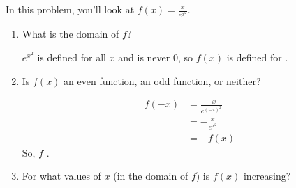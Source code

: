 \documentclass{article}
\begin{document}
\begin{enumerate}
  In this problem, you'll look at $\displaystyle f(x) =
  \frac{x}{e^{x^2}}$. 

  \begin{enumerate}

  \item
    \begin{problem}[0.5in]
      What is the domain of $f$?
    \end{problem}

    \begin{solution}
      $e^{x^2}$ is defined for all $x$ and is never 0, so $f(x)$ is
      defined for . 
    \end{solution}

  \item
    \begin{problem}[\vfill]
      Is $f(x)$ an even function, an odd function, or neither?
    \end{problem}

    \begin{solution}
      \begin{align*}
        f(-x) &= \frac{-x}{e^{(-x)^2}} \\
        &= - \frac{x}{e^{x^2}} \\
        &= - f(x)
      \end{align*}
      So, $f$ . 
    \end{solution}

  \item \label{curve-sketching-with-sub-2-increasing}
    \begin{problem}[\stretch{2}]
      For what values of $x$ (in the domain of $f$) is $f(x)$ increasing? 
    \end{problem}


\end{enumerate}
\end{enumerate}
\end{document}
